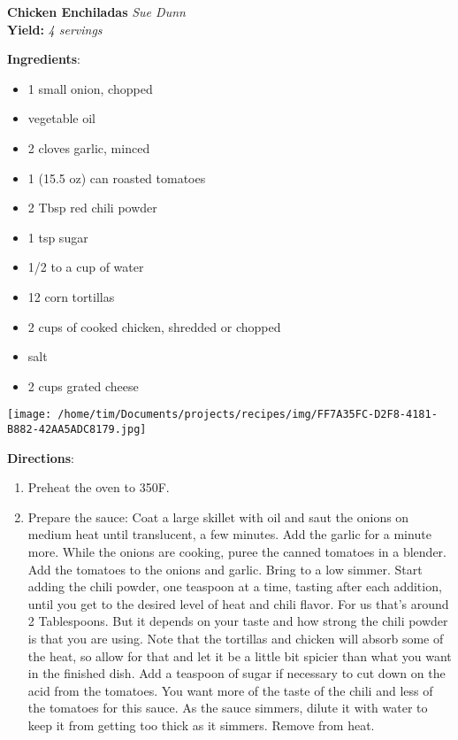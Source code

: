 \documentclass[11pt, twoside, openany]{book}
\begin{document}
\noindent\begin{minipage}[t]{\linewidth}%
{\Large\textbf{Chicken Enchiladas}} \label{chicken-enchiladas}\hfill\textit{Sue Dunn}\\
\textbf{Yield:} \textit{4 servings}\\
\noindent\begin{minipage}[t]{0.78\linewidth}%
\textbf{Ingredients}:\vspace{-3mm}
\begin{multicols}{2}
\begin{itemize}\setlength\itemsep{-1mm}
\item 1 small onion, chopped
\item vegetable oil
\item 2 cloves garlic, minced
\item 1 (15.5 oz) can roasted tomatoes
\item 2 Tbsp red chili powder
\item 1 tsp sugar
\item 1/2 to a cup of water
\item 12 corn tortillas
\item 2 cups of cooked chicken, shredded or chopped
\item salt
\item 2 cups grated cheese
\end{itemize}
\end{multicols}
\end{minipage}
\noindent\begin{minipage}[t]{0.18\linewidth}
\centering \strut\vspace*{-\baselineskip}\newline
\texttt{[image: /home/tim/Documents/projects/recipes/img/FF7A35FC-D2F8-4181-B882-42AA5ADC8179.jpg]}\\
\end{minipage}\vspace{3mm}
\textbf{Directions}:
\vspace{-3mm}\begin{enumerate}\setlength\itemsep{-1mm}
\item Preheat the oven to 350F.
\item Prepare the sauce: Coat a large skillet with oil and saut the onions on medium heat until translucent, a few minutes. Add the garlic for a minute more. While the onions are cooking, puree the canned tomatoes in a blender. Add the tomatoes to the onions and garlic. Bring to a low simmer. Start adding the chili powder, one teaspoon at a time, tasting after each addition, until you get to the desired level of heat and chili flavor. For us that's around 2 Tablespoons. But it depends on your taste and how strong the chili powder is that you are using. Note that the tortillas and chicken will absorb some of the heat, so allow for that and let it be a little bit spicier than what you want in the finished dish. Add a teaspoon of sugar if necessary to cut down on the acid from the tomatoes. You want more of the taste of the chili and less of the tomatoes for this sauce. As the sauce simmers, dilute it with water to keep it from getting too thick as it simmers. Remove from heat.

\end{enumerate}
\end{minipage}
\end{document}
